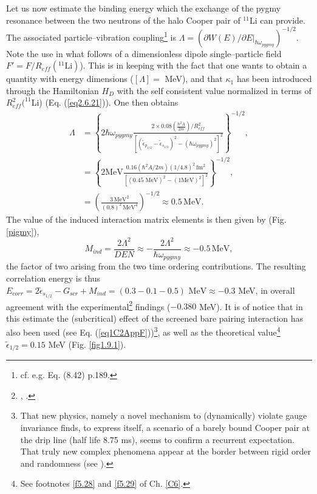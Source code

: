  Let us now estimate the binding energy which the exchange of the pygmy resonance between the two neutrons of the halo Cooper pair  of $^{11}$Li can provide.
The associated particle--vibration coupling\footnote{cf. e.g. \cite{Brink:05} Eq. (8.42) p.189.} is $\Lambda= \left(\partial W(E)/\partial E|_{\hbar\omega_{pygmy}}\right)^{-1/2}$. Note the use in what follows of a dimensionless dipole single--particle field $F'=F/R_{eff}(^{11}\text{Li})$). This is in keeping with the fact that one wants to obtain a quantity with energy dimensions ($[\Lambda]=$ MeV), and that $\kappa_1$ has been introduced through the Hamiltonian $H_D$ with the self consistent value normalized in terms of $R_{eff}^2(^{11}$Li) (Eq. (\ref{eq2.6.21})). 
 One then obtains
\begin{equation}
\begin{split}
\Lambda&=\left\{2\hbar \omega_{pygmy}\frac{2\times 0.08(\frac{\hbar^2A}{2m})/R_{eff}^2}{\left[(\tilde\epsilon_{p_{1/2}}-\tilde\epsilon_{s_{1/2}})^2-(\hbar\omega_{pygmy})^2\right]^2}\right\}^{-1/2},\\
&=\left\{2\text{MeV}\frac{0.16(\hbar^2A/2m)(1/4.8)^2\,\text{fm}^2}{\left[(0.45\text{ MeV})^2-(1\text{MeV})^2\right]^2}\right\}^{-1/2},\\
&=\left(\frac{3\,\text{MeV}^2}{(0.8)^2\,\text{MeV}^4}\right)^{-1/2}\approx 0.5\,\text{MeV}.
\end{split}
\end{equation}   
The value of the induced interaction matrix elements is then given by (Fig. \ref{pigmy}),
 \begin{equation}\label{eq2.F.10}
M_{ind}=\frac{2\Lambda^2}{DEN}\approx-\frac{2\Lambda^2}{\hbar\omega_{pygmy}}\approx-0.5\,\text{MeV},
 \end{equation}
 the factor of two arising from the two time ordering contributions. The resulting correlation energy is thus $E_{corr}=2\tilde\epsilon_{s_{1/2}}-G_{scr}+M_{ind}=(0.3-0.1-0.5)\text{ MeV}\approx- 0.3$ MeV, in overall agreement with the experimental\footnote{\cite{Bachelet:08}, \cite{Smith:08}.} findings ($-0.380$ MeV). It is of notice that in this estimate the (subcritical) effect of the screened bare pairing interaction has also been used (see Eq. (\ref{eq1C2AppF}))\footnote{That new physics, namely a novel mechanism to (dynamically) violate gauge invariance finds, to express itself, a scenario of a barely bound Cooper pair at the drip line (half life 8.75 ms), seems to confirm a recurrent expectation. That truly new complex phenomena appear at the border between rigid order and randomness (see \cite{DeGennes:94}).}, as well as  the theoretical value\footnote{See footnotes \ref{f5.28} and \ref{f5.29} of Ch. \ref{C6}.} $\tilde\epsilon_{1/2}=0.15$ MeV (Fig. \ref{fig1.9.1}).
 
